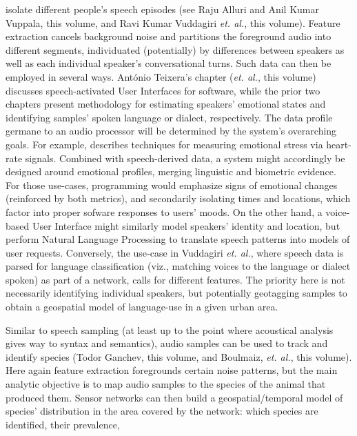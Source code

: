 {\begin{description}
isolate different people's speech episodes (see Raju Alluri 
and Anil Kumar Vuppala, this volume, and 
Ravi Kumar Vuddagiri \textit{et. al.}, this volume).  Feature 
extraction cancels background noise and partitions the foreground 
audio into different segments, individuated (potentially) by 
differences between speakers as well as each 
individual speaker's conversational turns.  Such data can 
then be employed in several ways.  Ant\'onio Teixera's chapter 
(\textit{et. al.}, this volume) discusses 
speech-activated User Interfaces for 
software, while the prior two chapters present methodology for 
estimating speakers' emotional states and 
identifying samples' spoken language or dialect, 
respectively.
\pseudoIndent{}
The data profile germane to 
an audio processor will be determined by the system's 
overarching goals.  For example, \cite{JongyoonChoi} describes 
techniques for measuring emotional stress via heart-rate signals.  
Combined with speech-derived data, a system might accordingly 
be designed around emotional profiles, merging linguistic and 
biometric evidence.  For those 
use-cases, programming would emphasize 
signs of emotional changes (reinforced by both metrics), 
and secondarily isolating times and locations, 
which factor into proper sofware responses to 
users' moods.  
\pseudoIndent{}
On the other hand, a voice-based 
User Interface might similarly model speakers' identity 
and location, but perform Natural Language Processing 
to translate speech patterns into models of user 
requests.  Conversely, the use-case in Vuddagiri 
\textit{et. al.}, where speech data is parsed for language 
classification (viz., matching voices to the language 
or dialect spoken) as part of a  network, 
calls for different features.    
The priority here is not necessarily identifying individual 
speakers, but potentially geotagging samples to obtain a geospatial model of language-use in a given urban area. 
\item[Bioacoustic Sampling]  Similar to speech sampling 
(at least up to the point where acoustical analysis 
gives way to syntax and semantics), 
audio samples can be used to track and identify 
species (Todor Ganchev, this volume, and Boulmaiz, \textit{et. al.}, 
this volume).  Here again feature 
extraction foregrounds certain noise patterns, but the 
main analytic objective is to map audio samples to 
the species of the animal that produced them.  
Sensor networks can then build a geospatial/temporal 
model of species' distribution in the area covered by 
the network: which species are identified, their prevalence, 

\end{description}}
